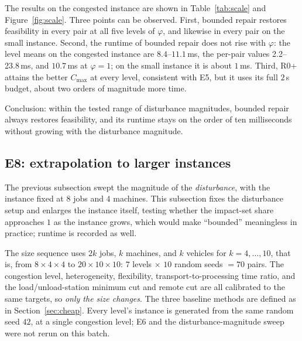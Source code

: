 \documentclass[manuscript,screen,review]{acmart}
\newcommand{\NSeeds}{10}
\newcommand{\ScaleMsMin}{2.2}       %
\newcommand{\ScaleMsMax}{23.8}      %
\newcommand{\ScaleKs}{7}
\newcommand{\ScalePairs}{70}
\newcommand{\ScaleJobsHi}{20}
\newcommand{\ScaleMachHi}{10}
\begin{document}
The results on the congested instance are shown in Table~\ref{tab:scale} and Figure~\ref{fig:scale}. Three points can be observed.
First, bounded repair restores feasibility in every pair at all five levels of \(\varphi\), and likewise in every pair on the small instance.
Second, the runtime of bounded repair does not rise with \(\varphi\): the level means on the congested instance are \(8.4\)--\(11.1\)\,ms,
the per-pair values \ScaleMsMin--\ScaleMsMax\,ms, and \(10.7\)\,ms at \(\varphi=1\); on the small instance it is about \(1\)\,ms.
Third, R0+ attains the better \(C_{\max}\) at every level, consistent with E5, but it uses its full \(2\)\,s budget, about two orders of magnitude more time.

Conclusion: within the tested range of disturbance magnitudes, bounded repair always restores feasibility, and its runtime stays on the order of ten milliseconds without growing with the disturbance magnitude.

\subsection{E8: extrapolation to larger instances}
\label{sec:instscale}

The previous subsection swept the magnitude of the \emph{disturbance}, with the instance fixed at \(8\) jobs and \(4\) machines. This subsection fixes the disturbance setup and enlarges the instance itself,
testing whether the impact-set share approaches \(1\) as the instance grows, which would make ``bounded'' meaningless in practice; runtime is recorded as well.

The size sequence uses \(2k\) jobs, \(k\) machines, and \(k\) vehicles for \(k=4,\dots,10\), that is, from \(8\times4\times4\) to
\(\ScaleJobsHi\times\ScaleMachHi\times\ScaleMachHi\): \(\ScaleKs\) levels \(\times\)
\(\NSeeds\) random seeds \(=\ScalePairs\) pairs. The congestion level, heterogeneity, flexibility, transport-to-processing time ratio, and the load/unload-station
minimum cut and remote cut are all calibrated to the same targets, so \emph{only the size changes}. The three baseline methods are defined as in Section~\ref{sec:cheap}.
Every level's instance is generated from the same random seed \(42\), at a single congestion level; E6 and the disturbance-magnitude sweep were not rerun on this batch.
\end{document}
